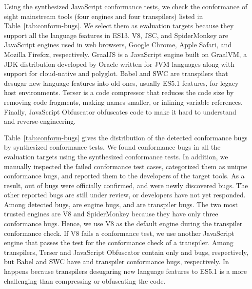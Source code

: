 
Using the synthesized JavaScript conformance tests, we check the conformance of
eight mainstream tools (four engines and four transpilers) listed in
Table~\ref{tab:conform-bugs}.
%
We select them as evaluation targets because they support all the language
features in ES13.
%
V8, JSC, and SpiderMonkey are JavaScript engines used in web browsers, Google
Chrome, Apple Safari, and Mozilla Firefox, respectively.
%
GraalJS is a JavaScript engine built on GraalVM, a JDK distribution developed by
Oracle written for JVM languages along with support for cloud-native and
polyglot.
%
Babel and SWC are transpilers that desugar new language features into old ones,
usually ES5.1 features, for legacy host environments.
%
Terser is a code compressor that reduces the code size by removing code
fragments, making names smaller, or inlining variable references.
%
Finally, JavaScript Obfuscator obfuscates code to make it hard to understand and
reverse-engineering.


Table~\ref{tab:conform-bugs} gives the distribution of the detected conformance
bugs by  synthesized conformance tests.
%
We found conformance bugs in all the evaluation targets using the synthesized
conformance tests.
%
In addition, we manually inspected the failed conformance test cases,
categorized them as  unique conformance bugs, and reported them to
the developers of the target tools.
%
As a result,  out of  bugs were officially confirmed, and
 were newly discovered bugs.
%
The other  reported bugs are still under review, or developers have
not yet responded.
%
Among  detected bugs,  are engine bugs, and  are
transpiler bugs.
%
The two most trusted engines are V8 and SpiderMonkey because they have only three
conformance bugs.
%
Hence, we use V8 as the default engine during the transpiler conformance check.
%
If V8 fails a conformance test, we use another JavaScript engine that passes the
test for the conformance check of a transpiler.
%
Among transpilers, Terser and JavaScript Obfuscator contain only  and
 bugs, respectively, but Babel and SWC have  and
 transpiler conformance bugs, respectively.
%
In happens because transpilers desugaring new language features to ES5.1 is a
more challenging than compressing or obfuscating the code.

